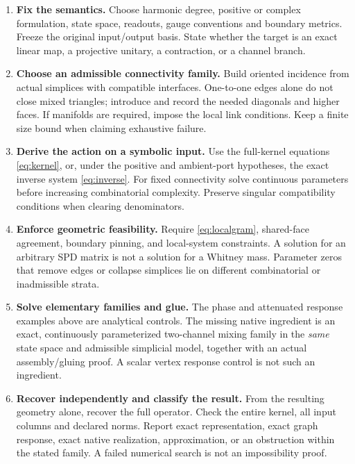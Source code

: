 \documentclass[11pt]{article}
\theoremstyle{definition}
\begin{document}
\begin{enumerate}[leftmargin=*,label=\textbf{Step \arabic*.}]
\item \textbf{Fix the semantics.}
Choose harmonic degree, positive or complex formulation, state space,
readouts, gauge conventions and boundary metrics. Freeze the original
input/output basis. State whether the target is an exact linear map,
a projective unitary, a contraction, or a channel branch.

\item \textbf{Choose an admissible connectivity family.}
Build oriented incidence from actual simplices with compatible
interfaces. One-to-one edges alone do not close mixed triangles;
introduce and record the needed diagonals and higher faces.
If manifolds are required, impose the local link conditions.
Keep a finite size bound when claiming exhaustive failure.

\item \textbf{Derive the action on a symbolic input.}
Use the full-kernel equations \eqref{eq:kernel}, or, under the positive
and ambient-port hypotheses, the exact inverse system \eqref{eq:inverse}.
For fixed connectivity solve continuous parameters before increasing
combinatorial complexity. Preserve singular compatibility conditions
when clearing denominators.

\item \textbf{Enforce geometric feasibility.}
Require \eqref{eq:localgram}, shared-face agreement, boundary pinning,
and local-system constraints. A solution for an arbitrary SPD matrix is
not a solution for a Whitney mass. Parameter zeros that remove edges or
collapse simplices lie on different combinatorial or inadmissible strata.

\item \textbf{Solve elementary families and glue.}
The phase and attenuated response examples above are analytical
controls. The missing native ingredient is an exact, continuously
parameterized two-channel mixing family in the \emph{same} state space
and admissible simplicial model, together with an actual assembly/gluing
proof. A scalar vertex response control is not such an ingredient.

\item \textbf{Recover independently and classify the result.}
From the resulting geometry alone, recover the full operator.
Check the entire kernel, all input columns and declared norms.
Report exact representation, exact graph response, exact native
realization, approximation, or an obstruction within the stated family.
A failed numerical search is not an impossibility proof.
\end{enumerate}
\end{document}
